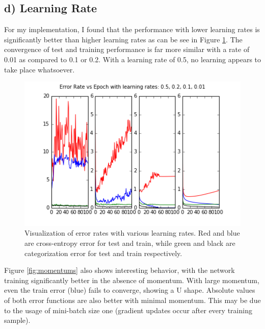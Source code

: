 \documentclass{article}
\begin{document}
\subsection{d) Learning Rate}

For my implementation, I found that the performance with lower learning rates is significantly better than higher learning rates as can be see in Figure \ref{fig:learnrates}.  The convergence of test and training performance is far more similar with a rate of 0.01 as compared to 0.1 or 0.2.  With a learning rate of 0.5, no learning appears to take place whatsoever. 
\begin{figure}[h]
  \centering
  \includegraphics[scale=0.8]{../learning_rates.png} 
  \caption{Visualization of error rates with various learning rates. Red and blue are cross-entropy error for test and train, while green and black are categorization error for test and train respectively. }
  \label{fig:learnrates}
\end{figure}

Figure \ref{fig:momentums} also shows interesting behavior, with the network training significantly better in the absence of momentum. With large momentum, even the train error (blue) fails to converge, showing a U shape. Absolute values of both error functions are also better with minimal momentum. This may be due to the usage of mini-batch size one (gradient updates occur after every training sample). 
\end{document}
